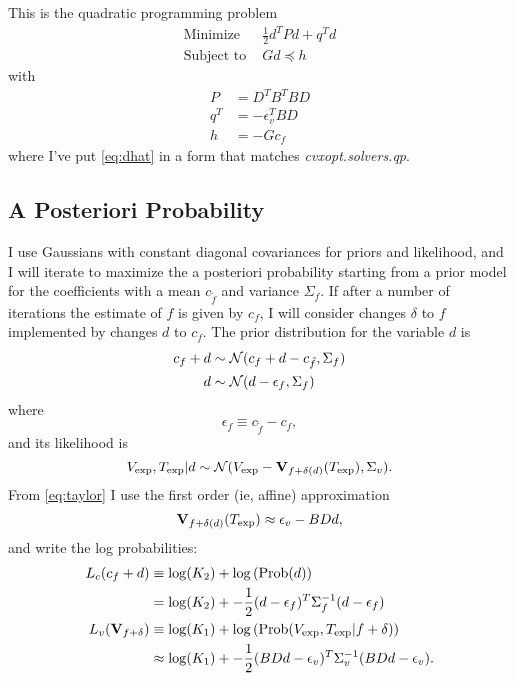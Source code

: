 \documentclass[11pt]{article}
\newcommand{\normal}[2]{{\cal N}(#1,#2)}
\newcommand{\normalexp}[3]{ -\frac{1}{2}
      (#1 - #2)^T #3^{-1} (#1 - #2) }
\newcommand{\fnom}{\tilde f}
\newcommand{\Prob}{\text{Prob}}
\newcommand\Vt{\mathbf{V}}
\newcommand\vexp{V_{\rm{exp}}}
\newcommand\texp{T_{\rm{exp}}}
\newcommand\cf{c_f}
\newcommand\epv{\epsilon_v}
\newcommand\epf{\epsilon_f}
\begin{document}
This is the quadratic programming problem
\begin{subequations}
  \label{eq:dhat}
  \begin{align}
    \text{Minimize } & \frac{1}{2} d^T P d + q^T d \\
  \label{eq:dhatb}
    \text{Subject to } & Gd \preceq h
  \end{align}
\end{subequations}
with
\begin{align*}
  P &= D^TB^TBD \\
  q^T &= -\epv^TBD \\
  h &= -G\cf
\end{align*}
where I've put \eqref{eq:dhat} in a form that matches
\emph{cvxopt.solvers.qp}.

\subsection{A Posteriori Probability}
\label{sec:app}

I use Gaussians with constant diagonal covariances for priors and
likelihood, and I will iterate to maximize the a posteriori
probability starting from a prior model for the coefficients with a
mean $c_{\fnom}$ and variance $\Sigma_f$.  If after a number of
iterations the estimate of $f$ is given by $c_f$, I will consider
changes $\delta$ to $f$ implemented by changes $d$ to $c_f$.  The
prior distribution for the variable $d$ is
\begin{align}
  \cf+d &\sim \normal{\cf+d - c_{\fnom}}{\Sigma_f} \nonumber \\
  \label{eq:priord}
  d &\sim \normal{d - \epf}{\Sigma_f}
\end{align}
where
\begin{equation}
  \label{eq:epf}
  \epf \equiv c_{\fnom} - c_f,
\end{equation}
and its likelihood is
\begin{equation}
  \label{eq:liked}
  \vexp,\texp | d \sim
  \normal{\vexp-\Vt_{f+\delta(d)}(\texp)}{\Sigma_v}.
\end{equation}
From \eqref{eq:taylor} I use the first order (ie, affine)
approximation
\begin{equation*}
  \Vt_{f+\delta(d)}(\texp) \approx \epv - BDd,
\end{equation*}
and write the log probabilities:
\begin{align}
  L_c(\cf+d) & \equiv \log(K_2) + \log \left(\Prob(d) \right)\nonumber\\
  \label{eq:L_c}
  & = \log(K_2) + \normalexp{d}{\epf}{\Sigma_f}\\
  L_v(\Vt_{f+\delta}) & \equiv \log(K_1) + \log
  \left(\Prob(\vexp,\texp | f+\delta) \right) \nonumber\\
  \label{eq:L_v}
  &\approx \log(K_1) + \normalexp{BDd}{\epv}{\Sigma_v}.
\end{align}
\end{document}

